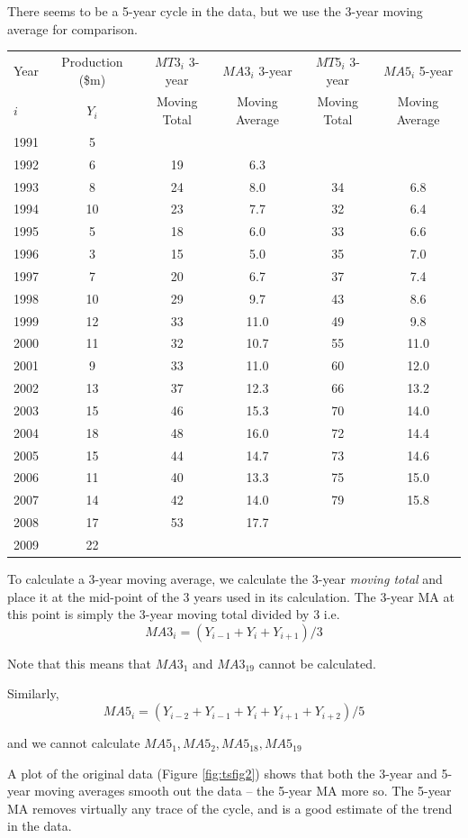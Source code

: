 \documentclass[12pt,a4paper,openany,twoside]{report}
\renewcommand{\emph}[1]{\textcolor{Emerald}{\textit{#1}}}
\theoremstyle{definition}
\theoremstyle{remark}
\theoremstyle{plain}
\theoremstyle{definition}
\theoremstyle{definition}
\theoremstyle{definition}
\theoremstyle{remark}
\begin{document}
There seems to be a 5-year cycle in the data, but we use the 3-year moving average for comparison. \newline

\begin{longtable}[c]{@{}lccccc@{}}
\toprule
Year & Production (\$m)  & \({MT3}_{i}\) 3-year & \({MA3}_{i}\) 3-year & \({MT5}_{i}\) 3-year & \({MA5}_{i}\) 5-year\\
\hspace*{\fill}$i$\hspace*{\fill} &\hspace*{\fill}$Y_{i}$\hspace*{\fill}& Moving Total & Moving Average & Moving Total & Moving Average
\tabularnewline
\midrule
\endhead
1991 & 5 & & & &\tabularnewline
1992 & 6 & 19 & 6.3 & &\tabularnewline
1993 & 8 & 24 & 8.0 & 34 & 6.8\tabularnewline
1994 & 10 & 23 & 7.7 & 32 & 6.4\tabularnewline
1995 & 5 & 18 & 6.0 & 33 & 6.6\tabularnewline
1996 & 3 & 15 & 5.0 & 35 & 7.0\tabularnewline
1997 & 7 & 20 & 6.7 & 37 & 7.4\tabularnewline
1998 & 10 & 29 & 9.7 & 43 & 8.6\tabularnewline
1999 & 12 & 33 & 11.0 & 49 & 9.8\tabularnewline
2000 & 11 & 32 & 10.7 & 55 & 11.0\tabularnewline
2001 & 9 & 33 & 11.0 & 60 & 12.0\tabularnewline
2002 & 13 & 37 & 12.3 & 66 & 13.2\tabularnewline
2003 & 15 & 46 & 15.3 & 70 & 14.0\tabularnewline
2004 & 18 & 48 & 16.0 & 72 & 14.4\tabularnewline
2005 & 15 & 44 & 14.7 & 73 & 14.6\tabularnewline
2006 & 11 & 40 & 13.3 & 75 & 15.0\tabularnewline
2007 & 14 & 42 & 14.0 & 79 & 15.8\tabularnewline
2008 & 17 & 53 & 17.7 & &\tabularnewline
2009 & 22 & & & &\tabularnewline
\bottomrule
\end{longtable}

\clearpage

To calculate a 3-year moving average, we calculate the 3-year
\emph{moving total} and place it at the mid-point of the 3 years used in its
calculation. The 3-year MA at this point is simply the 3-year moving
total divided by 3 i.e.
\[{MA3}_{i} = (Y_{i - 1} + Y_{i} + Y_{i + 1})/3\]

Note that this means that \(MA3_{1}\) and \(MA3_{19}\) cannot be calculated.

Similarly,
\[{MA5}_{i} = (Y_{i - 2} + Y_{i - 1} + Y_{i} + Y_{i + 1} + Y_{i + 2})/5\]

and we cannot calculate \(MA5_{1},MA5_{2},MA5_{18},MA5_{19}\)

A plot of the original data (Figure \ref{fig:tsfig2}) shows that both the 3-year and
5-year moving averages smooth out the data -- the 5-year MA more so. The
5-year MA removes virtually any trace of the cycle, and is a good
estimate of the trend in the data.\newline
\end{document}
